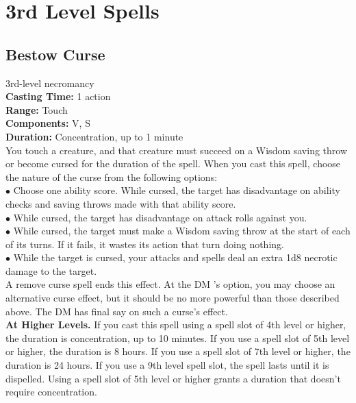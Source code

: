\documentclass[11pt, A4paper, english]{article}
\begin{document}
	\section{3rd Level Spells}
		\subsection{Bestow Curse}
3rd-level necromancy \\
\textbf{Casting Time:} 1 action \\
\textbf{Range:} Touch \\
\textbf{Components:} V, S \\
\textbf{Duration:} Concentration, up to 1 minute \\
You touch a creature, and that creature must succeed on a Wisdom saving throw or become cursed for the duration of the spell. When you cast this spell, choose the nature of the curse from the following options: \\
\indent $\bullet$ Choose one ability score. While cursed, the target has disadvantage on ability checks and saving throws made with that ability score. \\
\indent $\bullet$ While cursed, the target has disadvantage on attack rolls against you. \\
\indent $\bullet$ While cursed, the target must make a Wisdom saving throw at the start of each of its turns. If it fails, it wastes its action that turn doing nothing. \\
\indent $\bullet$ While the target is cursed, your attacks and spells deal an extra 1d8 necrotic damage to the target. \\
A remove curse spell ends this effect. At the DM ’s option, you may choose an alternative curse effect, but it should be no more powerful than those described above. The DM has final say on such a curse’s effect. \\
\textbf{At Higher Levels.} If you cast this spell using a spell slot of 4th level or higher, the duration is concentration, up to 10 minutes. If you use a spell slot of 5th level or higher, the duration is 8 hours. If you use a spell slot of 7th level or higher, the duration is 24 hours. If you use a 9th level spell slot, the spell lasts until it is dispelled. Using a spell slot of 5th level or higher grants a duration that doesn’t require concentration.
\end{document}
